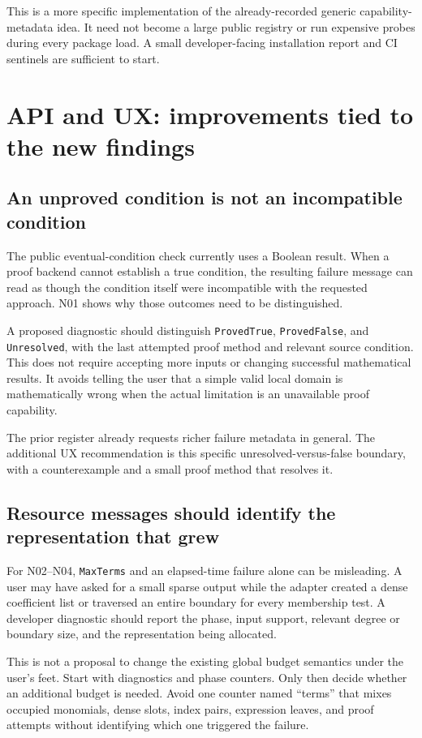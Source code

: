 \documentclass[11pt,letterpaper]{article}
\newcommand{\code}[1]{\nolinkurl{#1}}
\begin{document}
This is a more specific implementation of the already-recorded generic
capability-metadata idea. It need not become a large public registry or run
expensive probes during every package load. A small developer-facing
installation report and CI sentinels are sufficient to start.

\section{API and UX: improvements tied to the new findings}
\label{sec:ux}

\subsection{An unproved condition is not an incompatible condition}
The public eventual-condition check currently uses a Boolean result. When a
proof backend cannot establish a true condition, the resulting failure
message can read as though the condition itself were incompatible with the
requested approach. N01 shows why those outcomes need to be distinguished.
\cite{repo-iexpressions}

A proposed diagnostic should distinguish \code{ProvedTrue},
\code{ProvedFalse}, and \code{Unresolved}, with the last attempted proof
method and relevant source condition. This does not require accepting more
inputs or changing successful mathematical results. It avoids telling the
user that a simple valid local domain is mathematically wrong when the
actual limitation is an unavailable proof capability.

The prior register already requests richer failure metadata in general.
The additional UX recommendation is this specific unresolved-versus-false
boundary, with a counterexample and a small proof method that resolves it.

\subsection{Resource messages should identify the representation that grew}
For N02--N04, \code{MaxTerms} and an elapsed-time failure alone can be
misleading. A user may have asked for a small sparse output while the
adapter created a dense coefficient list or traversed an entire boundary
for every membership test. A developer diagnostic should report the phase,
input support, relevant degree or boundary size, and the representation
being allocated.

This is not a proposal to change the existing global budget semantics under
the user's feet. Start with diagnostics and phase counters. Only then decide
whether an additional budget is needed. Avoid one counter named ``terms''
that mixes occupied monomials, dense slots, index pairs, expression leaves,
and proof attempts without identifying which one triggered the failure.
\end{document}
